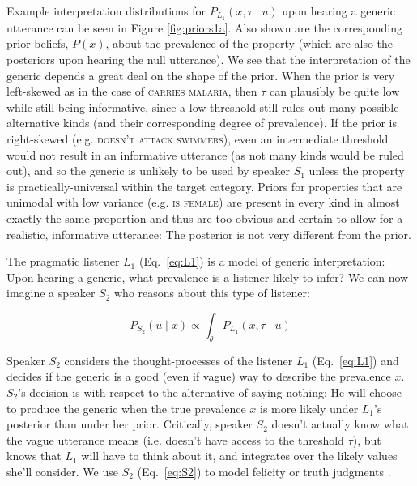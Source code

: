 \documentclass{pnastwo}
\begin{document}
\begin{article}
Example interpretation distributions for $P_{L_{1}}(x , \tau \mid u)$ upon hearing a generic utterance can be seen in Figure \ref{fig:priors1a}. 
Also shown are the corresponding prior beliefs, $P(x)$, about the prevalence of the property (which are also the posteriors upon hearing the null utterance).
We see that the interpretation of the generic depends a great deal on the shape of the prior.
When the prior is very left-skewed as in the case of \textsc{carries malaria}, then $\tau$ can plausibly be quite low while still being informative, since a low threshold still rules out many possible alternative kinds (and their corresponding degree of prevalence).
If the prior is right-skewed (e.g. \textsc{doesn't attack swimmers}), even an intermediate threshold would not result in an informative utterance (as not many kinds would be ruled out), and so the generic is unlikely to be used by speaker $S_1$ unless the property is practically-universal within the target category. 
Priors for properties that are unimodal with low variance (e.g. \textsc{is female}) are present in every kind in almost exactly the same proportion and thus are too obvious and certain to allow for a realistic, informative utterance: The posterior is not very different from the prior. 

The pragmatic listener $L_1$ (Eq.~\ref{eq:L1}) is a model of generic interpretation: Upon hearing a generic, what prevalence is a listener likely to infer?
We can now imagine a speaker $S_2$ who reasons about this type of listener: 

\begin{equation} 
P_{S_{2}}(u \mid x) \propto  \int_{\theta} P_{L_{1}}(x , \tau \mid u) %
\label{eq:S2}
\end{equation}

Speaker $S_2$ considers the thought-processes of the listener $L_1$ (Eq.~\ref{eq:L1}) and decides if the generic is a good (even if vague) way to describe the prevalence $x$. 
$S_2$'s decision is with respect to the alternative of saying nothing: He will choose to produce the generic when the true prevalence $x$ is more likely under $L_1$'s posterior than under her prior. 
Critically, speaker $S_{2}$ doesn't actually know what the vague utterance means (i.e. doesn't have access to the threshold $\tau$), but knows that $L_{1}$ will have to think about it, and integrates over the likely values she'll consider.
We use $S_{2}$ (Eq.~\ref{eq:S2}) to model felicity or truth judgments \cite{Degen2014}.



\end{article}
\end{document}
